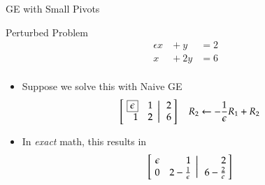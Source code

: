 \documentclass[10pt]{beamer}
\begin{document}
\begin{frame}{GE with Small Pivots}

\begin{block}{Perturbed Problem}
\[
\begin{alignedat}{4}
    &\epsilon x  &{}+ y  &= 2 \\
    &x &{}+ 2y   &= 6 \\
\end{alignedat}
\]
\end{block}
\begin{itemize}
    \item Suppose we solve this with Naive GE
\begin{equation*}
    \left[
           \left.\negthickspace\begin{array}{rrrr}  \boxed{\epsilon} &  1 \\
                                                    1 &  2 \end{array}
           \right|\begin{array}{r} 2 \\  6  \end{array}\negthickspace\right]
           \quad 
                       R_2 \leftarrow-\frac{1}{\epsilon}R_1 + R_2 
\end{equation*}
    \item In \textit{exact} math, this results in
    \begin{equation*}
    \left[
           \left.\negthickspace\begin{array}{rrrr} \epsilon &  1   \\
                                                    0 &  2-\frac{1}{\epsilon}  \end{array}
           \right|\begin{array}{r} 2 \\  6-\frac{2}{\epsilon}  \end{array}\negthickspace\right]
    \end{equation*}
\end{itemize}
\end{frame}

\end{document}
